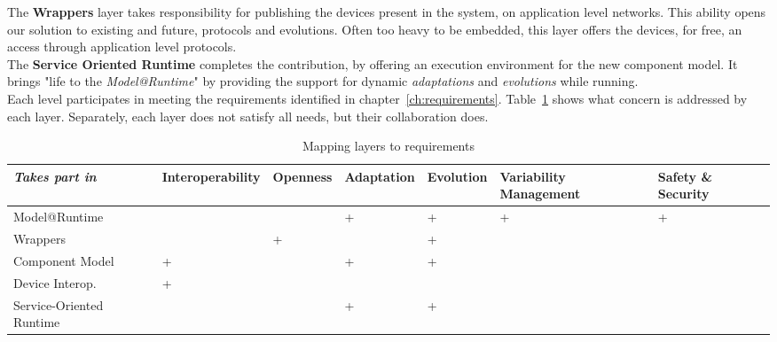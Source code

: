 The {\bf Wrappers} layer takes responsibility for publishing the devices present in the system, on application level networks. This ability opens our solution to existing and future, protocols and evolutions. Often too heavy to be embedded, this layer offers the devices, for free, an access through application level protocols.\\

The {\bf Service Oriented Runtime} completes the contribution, by offering an execution environment for the new component model. It brings "life to the {\it Model@Runtime}" by providing the support for dynamic {\it adaptations} and {\it evolutions} while running.\\

Each level participates in meeting the requirements identified in chapter~\ref{ch:requirements}. Table~\ref{table:layer_req} shows what concern is addressed by each layer. Separately, each layer does not satisfy all needs, but their collaboration does.\\

\begin{table}[h!]
\begin{tabular}{m{}| >{\centering\arraybackslash}m{}| >{\centering\arraybackslash}m{}| >{\centering\arraybackslash}m{}| >{\centering\arraybackslash}m{}| >{\centering}m{}| >{\centering\arraybackslash}m{}|}
 {\it Takes part in}& {\tiny Interoperability} & {\tiny Openness} & {\tiny Adaptation} & {\tiny Evolution} & {\tiny Variability Management} & {\tiny Safety \& Security}\\
 \hline\hline
 {\small Model@Runtime} & & & + & + & + & + \\
  \hline
 {\small Wrappers} & & + &  & + &  & \\
  \hline
 {\small Component Model} & + & & + & + & & \\
  \hline
 {\small Device Interop.} & + & & & & & \\
  \hline
 {\small Service-Oriented Runtime} & & & + & + & &\\
 \hline
\end{tabular}
 \caption{Mapping layers to requirements}
 \label{table:layer_req}
\end{table}


